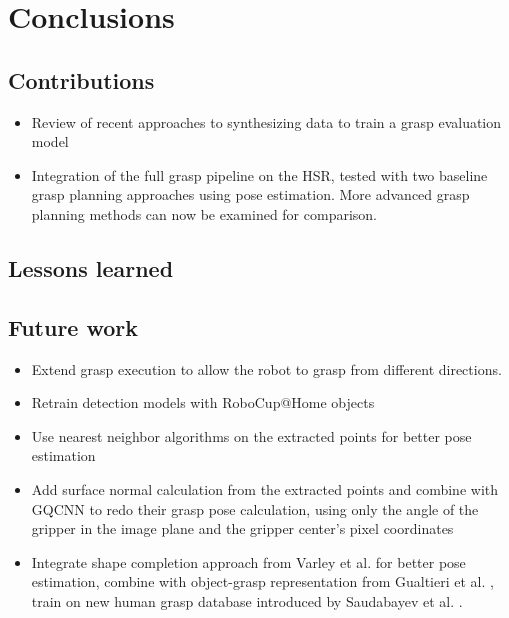 
\chapter{Conclusions}


\section{Contributions}
\begin{itemize}
    \item Review of recent approaches to synthesizing data to train a grasp evaluation model
    \item Integration of the full grasp pipeline on the HSR, tested with two baseline grasp planning approaches using
    pose estimation. More advanced grasp planning methods can now be examined for comparison.
\end{itemize}


\section{Lessons learned}


\section{Future work}
\begin{itemize}
    \item Extend grasp execution to allow the robot to grasp from different directions.
    \item Retrain detection models with RoboCup@Home objects
    \item Use nearest neighbor algorithms on the extracted points for better pose estimation
    \item Add surface normal calculation from the extracted points and combine with GQCNN to redo their grasp pose
    calculation, using only the angle of the gripper in the image plane and the gripper center's pixel coordinates
    \item Integrate shape completion approach from Varley et al. \cite{Varley2017} for better pose estimation, combine
    with object-grasp representation from Gualtieri et al. \cite{Gualtieri2016}, train on new human grasp database
    introduced by Saudabayev et al. \cite{Saudabayev2018}.
\end{itemize}